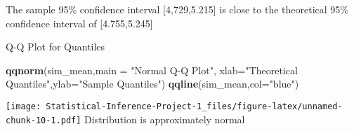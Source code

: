 \documentclass[
]{article}
\newenvironment{Shaded}{\begin{snugshade}}{\end{snugshade}}
\newcommand{\AttributeTok}[1]{\textcolor[rgb]{0.13,0.29,0.53}{#1}}
\newcommand{\FunctionTok}[1]{\textcolor[rgb]{0.13,0.29,0.53}{\textbf{#1}}}
\newcommand{\NormalTok}[1]{#1}
\newcommand{\StringTok}[1]{\textcolor[rgb]{0.31,0.60,0.02}{#1}}
\begin{document}
The sample 95\% confidence interval {[}4,729,5.215{]} is close to the
theoretical 95\% confidence interval of {[}4.755,5.245{]}

Q-Q Plot for Quantiles

\begin{Shaded}
\begin{Highlighting}[]
\FunctionTok{qqnorm}\NormalTok{(sim\_mean,}\AttributeTok{main =} \StringTok{"Normal Q{-}Q Plot"}\NormalTok{, }\AttributeTok{xlab=}\StringTok{"Theoretical Quantiles"}\NormalTok{,}\AttributeTok{ylab=}\StringTok{"Sample Quantiles"}\NormalTok{)}
\FunctionTok{qqline}\NormalTok{(sim\_mean,}\AttributeTok{col=}\StringTok{"blue"}\NormalTok{)}
\end{Highlighting}
\end{Shaded}

\texttt{[image: Statistical-Inference-Project-1\_files/figure-latex/unnamed-chunk-10-1.pdf]}
Distribution is approximately normal
\end{document}
